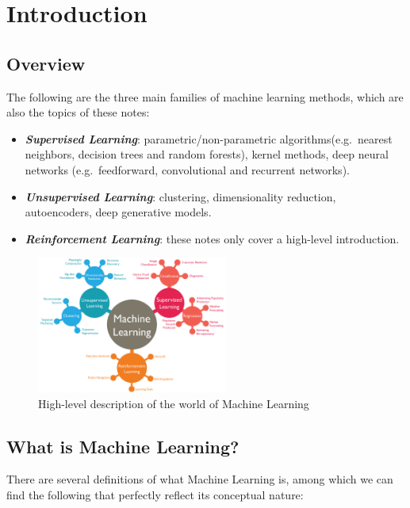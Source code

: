 \section{Introduction}

\subsection{Overview}
The following are the three main families of machine learning methods,
which are also the topics of these notes:

\begin{itemize}
    \item \emph{\textbf{Supervised Learning}}: parametric/non-parametric
          algorithms(e.g.\ nearest neighbors, decision trees and
          random forests), kernel methods, deep neural networks
          (e.g.\ feedforward, convolutional and recurrent networks).
    \item \emph{\textbf{Unsupervised Learning}}: clustering,
          dimensionality reduction, autoencoders, deep generative models.
    \item \emph{\textbf{Reinforcement Learning}}: these notes only cover
          a high-level introduction.
\end{itemize}

\vspace{20mm}

\begin{figure}[h]
    \centering
    \includegraphics[width=0.56\textwidth]{../img/World_of_ML}
    \caption{High-level description of the world of Machine Learning}
\end{figure}

\subsection{What is Machine Learning?}
There are several definitions of what Machine Learning is, among which
we can find the following that perfectly reflect its conceptual nature:

